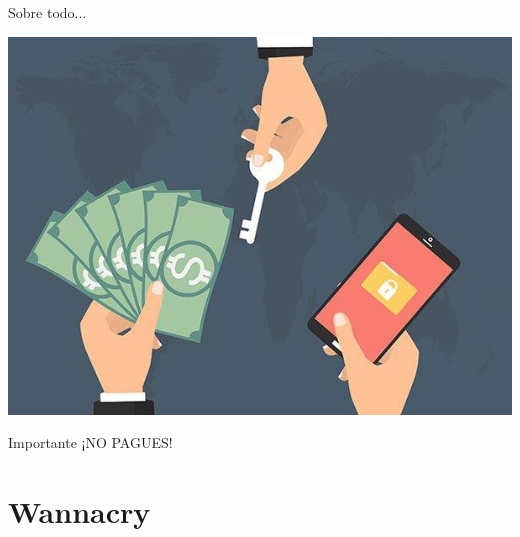 \documentclass[10pt]{beamer}
\begin{document}
\begin{frame}[fragile]{Sobre todo...}
	\begin{center}
		\includegraphics[scale=0.5]{./Imagenes/ransomware9.jpg}
	\end{center}
	\pause
	\begin{alertblock}{Importante}
		¡NO PAGUES!
	\end{alertblock}
\end{frame}

\section{Wannacry}
\end{document}
